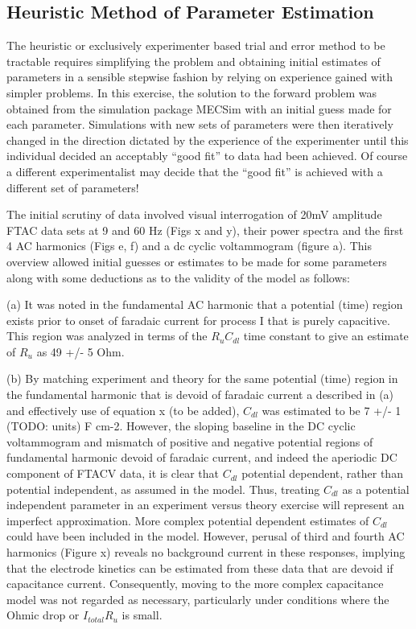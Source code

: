 \documentclass[a4paper, 12pt]{article}
\begin{document}
\subsection{Heuristic Method of Parameter Estimation}

The heuristic or exclusively experimenter based trial and error method to be 
tractable requires simplifying the problem and obtaining initial estimates of 
parameters in a sensible stepwise fashion by relying on experience gained with 
simpler problems. In this exercise, the solution to the forward problem was 
obtained from the simulation package MECSim with an initial guess made for each 
parameter. Simulations with new sets of parameters were then iteratively changed 
in the direction dictated by the experience of the experimenter until this 
individual decided an acceptably “good fit” to data had been achieved. Of course 
a different experimentalist may decide that the “good fit” is achieved with a 
different set of parameters!

The initial scrutiny of data involved visual interrogation of   20mV amplitude 
FTAC data sets at 9 and 60 Hz (Figs x and y), their power spectra and the first 
4 AC harmonics (Figs e, f) and a dc cyclic voltammogram (figure a). This 
overview allowed initial guesses or estimates to be made for some parameters 
along with some deductions as to the validity of the model as follows:

(a) It was noted in the fundamental AC harmonic that a potential (time) region 
exists prior to onset of faradaic current for process I that is purely 
capacitive.  This region was analyzed in terms of the $R_u  C_{dl}$ time constant to 
give an estimate of $R_u$ as 49 +/- 5 Ohm. 

(b) By matching experiment and theory  for the same potential (time) region in 
the fundamental  harmonic that is devoid of faradaic current a described in (a) 
and effectively use of equation x (to be added), $C_{dl}$ was estimated to be 7 
+/- 1 (TODO: units) F cm-2. However, the sloping baseline in  the DC cyclic 
voltammogram and mismatch of positive and negative potential regions of 
fundamental harmonic devoid of faradaic current, and indeed the aperiodic DC 
component of FTACV data, it is clear that $C_{dl}$  potential dependent, rather 
than potential independent, as assumed in the model. Thus, treating $C_{dl}$ as a 
potential independent parameter in an experiment versus theory exercise will 
represent an imperfect approximation.  More complex potential dependent 
estimates of $C_{dl}$ could have been included in the model. However, perusal of 
third and fourth AC harmonics (Figure x) reveals no background current in these 
responses, implying that the electrode kinetics can be estimated from these data 
that are devoid if capacitance current.  Consequently, moving to the more 
complex capacitance model was not regarded as necessary, particularly under 
conditions where the Ohmic drop or $I_{total} R_u$ is small.
\end{document}
